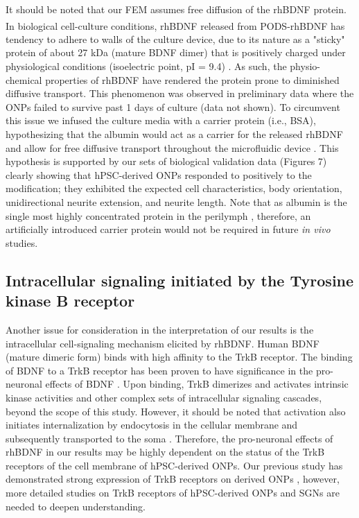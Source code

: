 \documentclass[review]{elsarticle}
\begin{document}
\indent It should be noted that our FEM assumes free diffusion of the rhBDNF protein. In biological cell-culture conditions, rhBDNF released from PODS\textsuperscript{\textregistered}-rhBDNF has tendency to adhere to walls of the culture device, due to its nature as a "sticky" protein of about 27 kDa (mature BDNF dimer) that is positively charged under physiological conditions (isoelectric point, pI = 9.4) \cite{Sasi2017}. As such, the physio-chemical properties of rhBDNF have rendered the protein prone to diminished diffusive transport. This phenomenon was observed in preliminary data where the ONPs failed to survive past 1 days of culture (data not shown). To circumvent this issue we infused the culture media with a carrier protein (i.e., BSA), hypothesizing that the albumin would act as a carrier for the released rhBDNF and allow for free diffusive transport throughout the microfluidic device \cite{Li2010}. This hypothesis is supported by our sets of biological validation data (Figures 7) clearly showing that hPSC-derived ONPs responded to positively to the modification; they exhibited the expected cell characteristics, body orientation, unidirectional neurite extension, and neurite length. Note that as albumin is the single most highly concentrated protein in the perilymph \cite{Swan2009}, therefore, an artificially introduced carrier protein would not be required in future \textit{in vivo} studies.  

\subsection{Intracellular signaling initiated by the Tyrosine kinase B receptor}
Another issue for consideration in the interpretation of our results is the intracellular cell-signaling mechanism elicited by rhBDNF. Human BDNF (mature dimeric form) binds with high affinity to the TrkB receptor. The binding of BDNF to a TrkB receptor has been proven to have significance in the pro-neuronal effects of BDNF \cite{green2012}. Upon binding, TrkB dimerizes and activates intrinsic kinase activities and other complex sets of intracellular signaling cascades, beyond the scope of this study. However, it should be noted that activation also initiates internalization by endocytosis in the cellular membrane and subsequently transported to the soma \cite{Numakawa2010}. Therefore, the pro-neuronal effects of rhBDNF in our results may be highly dependent on the status of the TrkB receptors of the cell membrane of hPSC-derived ONPs. Our previous study has demonstrated strong expression of TrkB receptors on derived ONPs \cite{Matsuoka2017}, however, more detailed studies on TrkB receptors of hPSC-derived ONPs and SGNs are needed to deepen understanding.
\end{document}
